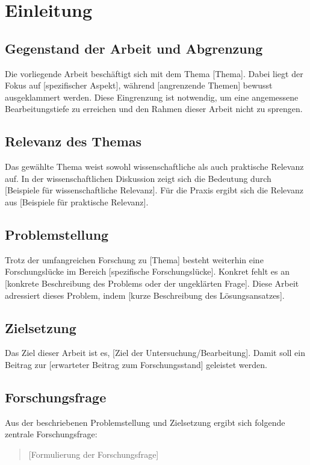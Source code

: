 \chapter{Einleitung}
\label{chap:einleitung}

\section{Gegenstand der Arbeit und Abgrenzung}
Die vorliegende Arbeit beschäftigt sich mit dem Thema [Thema]. Dabei liegt der Fokus auf [spezifischer Aspekt], während [angrenzende Themen] bewusst ausgeklammert werden. Diese Eingrenzung ist notwendig, um eine angemessene Bearbeitungstiefe zu erreichen und den Rahmen dieser Arbeit nicht zu sprengen.

\section{Relevanz des Themas}
Das gewählte Thema weist sowohl wissenschaftliche als auch praktische Relevanz auf. In der wissenschaftlichen Diskussion zeigt sich die Bedeutung durch [Beispiele für wissenschaftliche Relevanz]. Für die Praxis ergibt sich die Relevanz aus [Beispiele für praktische Relevanz]. 


\section{Problemstellung}
Trotz der umfangreichen Forschung zu [Thema] besteht weiterhin eine Forschungslücke im Bereich [spezifische Forschungslücke]. Konkret fehlt es an [konkrete Beschreibung des Problems oder der ungeklärten Frage]. Diese Arbeit adressiert dieses Problem, indem [kurze Beschreibung des Lösungsansatzes].

\section{Zielsetzung}
Das Ziel dieser Arbeit ist es, [Ziel der Untersuchung/Bearbeitung]. Damit soll ein Beitrag zur [erwarteter Beitrag zum Forschungsstand] geleistet werden.

\section{Forschungsfrage}
Aus der beschriebenen Problemstellung und Zielsetzung ergibt sich folgende zentrale Forschungsfrage:
\begin{quote}
[Formulierung der Forschungsfrage]
\end{quote}

